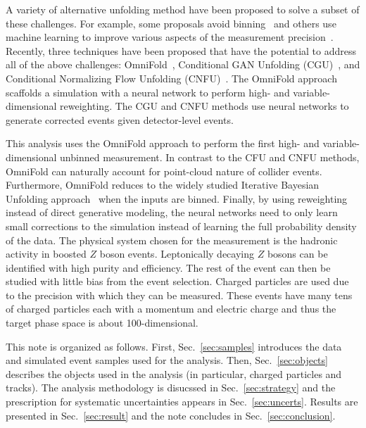 \documentclass[NOTE, atlasdraft=true, texlive=2016, UKenglish]{\ATLASLATEXPATH atlasdoc}
\begin{document}
A variety of alternative unfolding method have been proposed to solve a subset of these challenges.   For example, some proposals avoid binning~\cite{Glazov:2017vni,Datta:2018mwd,Lindemann:1995ut,Aslan:2003vu} and others use machine learning to improve various aspects of the measurement precision~\cite{Gagunashvili:2010zw,Glazov:2017vni,Datta:2018mwd}.  Recently, three techniques have been proposed that have the potential to address all of the above challenges: OmniFold~\cite{1911.09107}, Conditional GAN Unfolding (CGU)~\cite{Bellagente:2019uyp}, and Conditional Normalizing Flow Unfolding (CNFU)~\cite{Bellagente:2020piv}.   The OmniFold approach scaffolds a simulation with a neural network to perform high- and variable-dimensional reweighting.  The CGU and CNFU methods use neural networks to generate corrected events given detector-level events.

This analysis uses the OmniFold approach to perform the first high- and variable-dimensional unbinned measurement.  In contrast to the CFU and CNFU methods, OmniFold can naturally account for point-cloud nature of collider events.  Furthermore, OmniFold reduces to the widely studied Iterative Bayesian Unfolding approach~\cite{DAGOSTINI1995487} when the inputs are binned.  Finally, by using reweighting instead of direct generative modeling, the neural networks need to only learn small corrections to the simulation instead of learning the full probability density of the data.   The physical system chosen for the measurement is the hadronic activity in boosted $Z$ boson events.  Leptonically decaying $Z$ bosons can be identified with high purity and efficiency.  The rest of the event can then be studied with little bias from the event selection.  Charged particles are used due to the precision with which they can be measured.  These events have many tens of charged particles each with a momentum and electric charge and thus the target phase space is about 100-dimensional.

This note is organized as follows.  First, Sec.~\ref{sec:samples} introduces the data and simulated event samples used for the analysis.  Then, Sec.~\ref{sec:objects} describes the objects used in the analysis (in particular, charged particles and tracks).  The analysis methodology is disucssed in Sec.~\ref{sec:strategy} and the prescription for systematic uncertainties appears in Sec.~\ref{sec:uncerts}.  Results are presented in Sec.~\ref{sec:result} and the note concludes in Sec.~\ref{sec:conclusion}.

\end{document}
